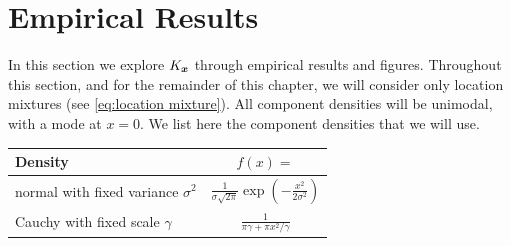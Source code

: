 
	




\section{Empirical Results}
\label{sec:empirical results}
	In this section we explore $K_{\bm{{x}}}$ through empirical results and figures. Throughout this section, and for the remainder of this chapter, we will consider only location mixtures (see \eqref{eq:location mixture}). All component densities will be unimodal, with a mode at $x = 0$. We list here the component densities that we will use.

	\begin{tabular}{l | c}
		Density & $f(x) = $\\
		\hline
		normal with fixed variance $\sigma^2$ & $\frac{1}{\sigma \sqrt{2 \pi}} \exp\left(-\frac{x^2}{2\sigma^2}\right) $\\
		Cauchy with fixed scale $\gamma$ & $\frac{1}{\pi \gamma + \pi x^2/\gamma}$
	\end{tabular}

